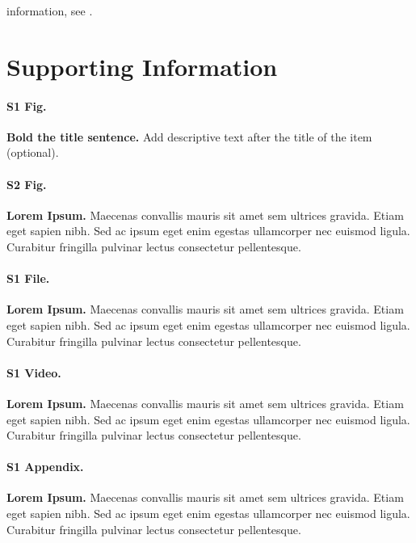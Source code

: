 \documentclass[10pt,letterpaper]{article}
\begin{document}
information, see .

\section*{Supporting Information}

\paragraph*{S1 Fig.}
\label{S1_Fig}
{\bf Bold the title sentence.} Add descriptive text after the title of the item
(optional).

\paragraph*{S2 Fig.}
\label{S2_Fig}
{\bf Lorem Ipsum.} Maecenas convallis mauris sit amet sem ultrices gravida.
Etiam eget sapien nibh. Sed ac ipsum eget enim egestas ullamcorper nec euismod
ligula. Curabitur fringilla pulvinar lectus consectetur pellentesque.

\paragraph*{S1 File.}
\label{S1_File}
{\bf Lorem Ipsum.}  Maecenas convallis mauris sit amet sem ultrices gravida.
Etiam eget sapien nibh. Sed ac ipsum eget enim egestas ullamcorper nec euismod
ligula. Curabitur fringilla pulvinar lectus consectetur pellentesque.

\paragraph*{S1 Video.}
\label{S1_Video}
{\bf Lorem Ipsum.}  Maecenas convallis mauris sit amet sem ultrices gravida.
Etiam eget sapien nibh. Sed ac ipsum eget enim egestas ullamcorper nec euismod
ligula. Curabitur fringilla pulvinar lectus consectetur pellentesque.

\paragraph*{S1 Appendix.}
\label{S1_Appendix}
{\bf Lorem Ipsum.} Maecenas convallis mauris sit amet sem ultrices gravida.
Etiam eget sapien nibh. Sed ac ipsum eget enim egestas ullamcorper nec euismod
ligula. Curabitur fringilla pulvinar lectus consectetur pellentesque.
\end{document}
